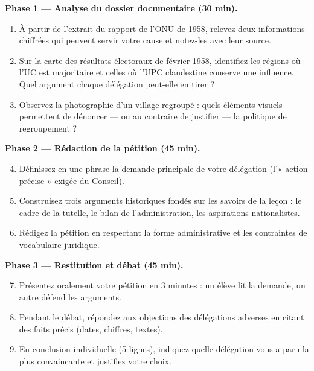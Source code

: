 \documentclass[11pt]{article}
\newcounter{popsec}
\newcounter{popsub}
\newcommand{\courssub}[1]{%
  \stepcounter{popsub}%
  \par\vspace{9pt}\noindent{\popxbold\fontsize{11.5}{13}\selectfont\color{popink}{\color{poporange}\thepopsec.\thepopsub}\hspace{6pt}#1}\par\nopagebreak\vspace{4pt}
}
\begin{document}
\textbf{Phase 1 — Analyse du dossier documentaire (30 min).}
\begin{enumerate}
\item À partir de l'extrait du rapport de l'ONU de 1958, relevez deux informations chiffrées qui peuvent servir votre cause et notez-les avec leur source.
\item Sur la carte des résultats électoraux de février 1958, identifiez les régions où l'UC est majoritaire et celles où l'UPC clandestine conserve une influence. Quel argument chaque délégation peut-elle en tirer ?
\item Observez la photographie d'un village regroupé : quels éléments visuels permettent de dénoncer — ou au contraire de justifier — la politique de regroupement ?
\end{enumerate}

\textbf{Phase 2 — Rédaction de la pétition (45 min).}
\begin{enumerate}
\setcounter{enumi}{3}
\item Définissez en une phrase la demande principale de votre délégation (l'« action précise » exigée du Conseil).
\item Construisez trois arguments historiques fondés sur les savoirs de la leçon : le cadre de la tutelle, le bilan de l'administration, les aspirations nationalistes.
\item Rédigez la pétition en respectant la forme administrative et les contraintes de vocabulaire juridique.
\end{enumerate}

\textbf{Phase 3 — Restitution et débat (45 min).}
\begin{enumerate}
\setcounter{enumi}{6}
\item Présentez oralement votre pétition en 3 minutes : un élève lit la demande, un autre défend les arguments.
\item Pendant le débat, répondez aux objections des délégations adverses en citant des faits précis (dates, chiffres, textes).
\item En conclusion individuelle (5 lignes), indiquez quelle délégation vous a paru la plus convaincante et justifiez votre choix.
\end{enumerate}

\courssub{Ressources à mobiliser}
\end{document}

